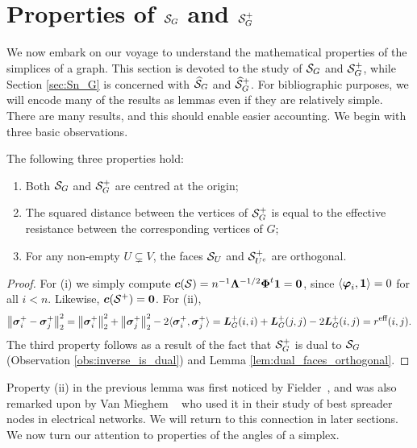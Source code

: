  



\section{Properties of \texorpdfstring{$\mathcal{S}_G$}{the Combinatorial Simplex} and \texorpdfstring{$\mathcal{S}_G^+$}{its inverse}}
\label{sec:S_G}
We now embark on our voyage to understand the mathematical properties of the simplices of a graph. This section is devoted to the study of $\mathcal{S}_G$ and $\mathcal{S}_G^+$, while Section \ref{sec:Sn_G} is concerned with $\widehat{\mathcal{S}}_G$ and $\widehat{\mathcal{S}}_G^+$. For bibliographic purposes, we will encode many of the results as lemmas even if they are relatively simple. There are many results, and this should enable easier accounting. We begin with three basic observations. 

\begin{lemma}
	\label{lem:S_G_basic_properties}
	The following three properties hold: 
	\begin{enumerate}
		\item 	Both $\mathcal{S}_G$ and $\mathcal{S}_G^+$ are centred at the origin;
		\item The squared distance between the vertices of $\mathcal{S}_G^+$ is equal to the effective resistance between the corresponding vertices of $G$; 
		\item For any non-empty $U\subsetneq V$, the faces $\mathcal{S}_U$ and $\mathcal{S}^+_{U^c}$ are orthogonal. 
	\end{enumerate}
\end{lemma}
\begin{proof}
	For (i) we  simply compute $\vb*{c}(\mathcal{S}) = n^{-1}\vb{\Lambda}^{-1/2}\boldsymbol{\Phi}^t \vb{1} =\vb{0}$, since $\langle \vb*{\varphi}_i,\vb{1}\rangle =0$ for all $i<n$.  Likewise, $\vb*{c}(\mathcal{S}^+)=\vb{0}$. For (ii), 
	\begin{equation*}
	\norm{\vb*{\sigma}_i^+-\vb*{\sigma}_j^+}_2^2 = \norm{\vb*{\sigma}_i^+}_2^2 + \norm{\vb*{\sigma}_j^+}_2^2 - 2\langle \vb*{\sigma}_i^+,\vb*{\sigma}_j^+\rangle = \vb*{L}_G^+(i,i) + \vb*{L}_G^+(j,j) - 2\vb*{L}_G^+(i,j) = r^{\textnormal{eff}}(i,j).
	\end{equation*}
	The third property follows as a result of the fact that $\mathcal{S}_G^+$ is dual to $\mathcal{S}_G$ (Observation \ref{obs:inverse_is_dual}) and Lemma \ref{lem:dual_faces_orthogonal}. 
\end{proof}




Property (ii) in the previous lemma was first noticed by Fielder~\cite[Chapter 6]{fiedler2011matrices}, and was also remarked upon by Van Mieghem \etal~\cite{van2017pseudoinverse} who used it in their study of best spreader nodes in electrical networks. 
We will return to this connection in later sections. We now turn our attention to properties of the angles of a simplex.  

